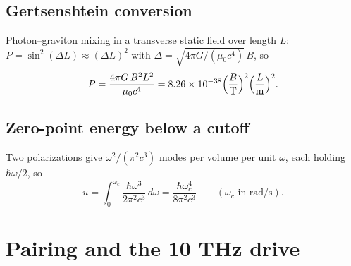 \subsection{Gertsenshtein conversion}
\begin{statement}
Photon--graviton mixing in a transverse static field over length $L$: $P=\sin^2(\Delta L)\approx(\Delta L)^2$ with
$\Delta=\sqrt{4\pi G/(\mu_0c^4)}\,B$, so
\begin{equation}
P=\frac{4\pi G\,B^2L^2}{\mu_0c^4}=8.26\times10^{-38}\Big(\frac{B}{\rm T}\Big)^2\Big(\frac{L}{\rm m}\Big)^2 .\label{eq:gert}
\end{equation}
\end{statement}

\subsection{Zero-point energy below a cutoff}
\begin{statement}
Two polarizations give $\omega^2/(\pi^2c^3)$ modes per volume per unit $\omega$, each holding $\hbar\omega/2$, so
\begin{equation}
u=\int_0^{\omega_c}\frac{\hbar\omega^3}{2\pi^2c^3}\,d\omega=\frac{\hbar\omega_c^4}{8\pi^2c^3}\qquad(\omega_c\text{ in rad/s}).\label{eq:zpe}
\end{equation}
\end{statement}

\section{Pairing and the 10 THz drive}


